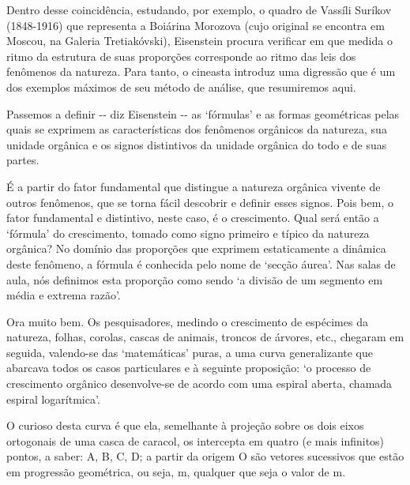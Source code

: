 Dentro desse coincidência, estudando, por exemplo, o quadro de Vassíli
Suríkov (1848-1916) que representa a Boiárina Morozova (cujo original se
encontra em Moscou, na Galeria Tretiakóvski), Eisenstein procura
verificar em que medida o ritmo da estrutura de suas proporções
corresponde ao ritmo das leis dos fenômenos da natureza. Para tanto, o
cineasta introduz uma digressão que é um dos exemplos máximos de seu
método de análise, que resumiremos aqui.

Passemos a definir -\/- diz Eisenstein -\/- as `fórmulas' e as formas
geométricas pelas quais se exprimem as características dos fenômenos
orgânicos da natureza, sua unidade orgânica e os signos distintivos da
unidade orgânica do todo e de suas partes.

É a partir do fator fundamental que distingue a natureza orgânica
vivente de outros fenômenos, que se torna fácil descobrir e definir
esses signos. Pois bem, o fator fundamental e distintivo, neste caso, é
o crescimento. Qual será então a `fórmula' do crescimento, tomado como
signo primeiro e típico da natureza orgânica? No domínio das proporções
que exprimem estaticamente a dinâmica deste fenômeno, a fórmula é
conhecida pelo nome de `secção áurea'. Nas salas de aula, nós definimos
esta proporção como sendo `a divisão de um segmento em média e extrema
razão'.

Ora muito bem. Os pesquisadores, medindo o crescimento de espécimes da
natureza, folhas, corolas, cascas de animais, troncos de árvores, etc.,
chegaram em seguida, valendo-se das `matemáticas' puras, a uma curva
generalizante que abarcava todos os casos particulares e à seguinte
proposição: `o processo de crescimento orgânico desenvolve-se de acordo
com uma espiral aberta, chamada espiral logarítmica'.


O curioso desta curva é que ela, semelhante à projeção sobre os dois
eixos ortogonais de uma casca de caracol, os intercepta em quatro (e
mais infinitos) pontos, a saber: A, B, C, D; a partir da origem {O} são
vetores sucessivos que estão em progressão geométrica, ou seja,
m, qualquer que seja o valor de {m}.

